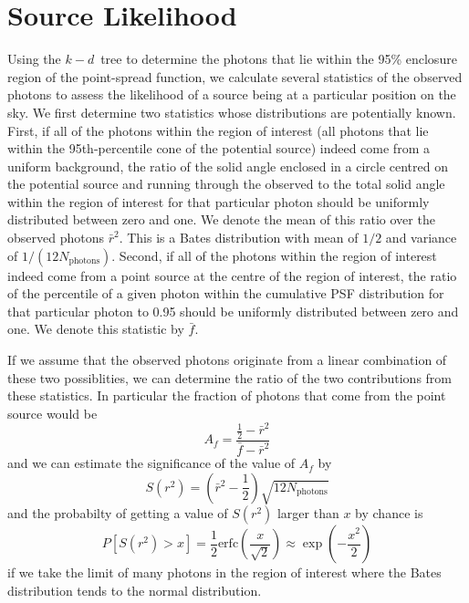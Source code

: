 \documentclass[useAMS,usenatbib]{mn2e}
\begin{document}
\section{Source Likelihood}
\label{sec:source-likelihood}

Using the $k-d$~tree to determine the photons that lie within the 95\%
enclosure region of the point-spread function, we calculate several
statistics of the observed photons to assess the likelihood of a
source being at a particular position on the sky.  We first determine
two statistics whose distributions are potentially known. First, if
all of the photons within the region of interest (all photons that lie
within the 95th-percentile cone of the potential source) indeed come
from a uniform background, the ratio of the solid angle enclosed in a
circle centred on the potential source and running through the
observed to the total solid angle within the region of interest for
that particular photon should be uniformly distributed between zero
and one.  We denote the mean of this ratio over the observed photons
$\bar r^2$.  This is a Bates distribution with mean of $1/2$ and
variance of $1/(12 N_\mathrm{photons})$.  Second, if all of the
photons within the region of interest indeed come from a point source
at the centre of the region of interest, the ratio of the percentile
of a given photon within the cumulative PSF distribution for that
particular photon to 0.95 should be uniformly distributed between zero
and one.  We denote this statistic by $\bar f$.

If we assume that the observed photons originate from a linear
combination of these two possiblities, we can determine the ratio of
the two contributions from these statistics. In particular the fraction
of photons that come from the point source would be
\begin{equation}
  A_f=\frac{\frac{1}{2}-\bar r^2}{\bar f-\bar r^2}
  \label{eq:1}
\end{equation}
and we can estimate the significance of the value of $A_f$ by
\begin{equation}
  S(r^2) = \left ( \bar r^2-\frac{1}{2} \right ) \sqrt{12 N_\mathrm{photons}}
\label{eq:2}
\end{equation}
and the probabilty of getting a value of $S(r^2)$ larger than $x$ by
chance is
\begin{equation}
  P\left [ S(r^2) > x \right ] = \frac{1}{2} \mathrm{erfc} \left ( \frac{x}{\sqrt{2}} \right
  ) \approx \exp \left (-\frac{x^2}{2} \right )
  \label{eq:3}
\end{equation}
if we take the limit of many photons in the region of interest where
the Bates distribution tends to the normal distribution.  
\end{document}
